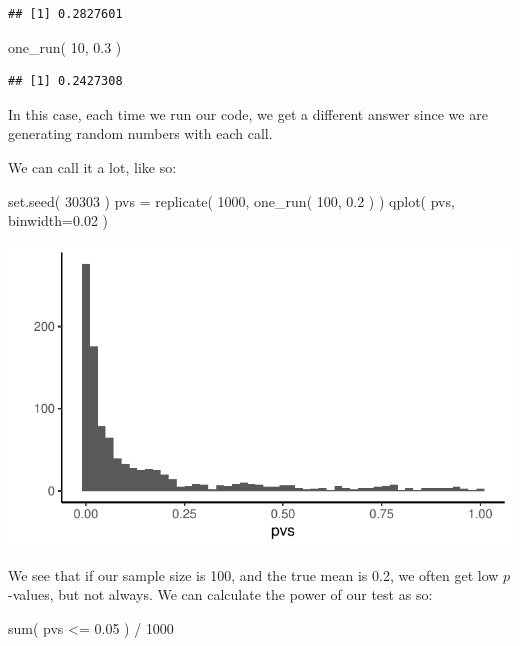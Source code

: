 \documentclass[
]{book}
\newenvironment{Shaded}{\begin{snugshade}}{\end{snugshade}}
\newcommand{\AttributeTok}[1]{\textcolor[rgb]{0.77,0.63,0.00}{#1}}
\newcommand{\DecValTok}[1]{\textcolor[rgb]{0.00,0.00,0.81}{#1}}
\newcommand{\FloatTok}[1]{\textcolor[rgb]{0.00,0.00,0.81}{#1}}
\newcommand{\FunctionTok}[1]{\textcolor[rgb]{0.00,0.00,0.00}{#1}}
\newcommand{\NormalTok}[1]{#1}
\newcommand{\OtherTok}[1]{\textcolor[rgb]{0.56,0.35,0.01}{#1}}
\newcommand{\SpecialCharTok}[1]{\textcolor[rgb]{0.00,0.00,0.00}{#1}}
\begin{document}
\begin{verbatim}
## [1] 0.2827601
\end{verbatim}

\begin{Shaded}
\begin{Highlighting}[]
\FunctionTok{one\_run}\NormalTok{( }\DecValTok{10}\NormalTok{, }\FloatTok{0.3}\NormalTok{ )}
\end{Highlighting}
\end{Shaded}

\begin{verbatim}
## [1] 0.2427308
\end{verbatim}

In this case, each time we run our code, we get a different answer since we are generating random numbers with each call.

We can call it a lot, like so:

\begin{Shaded}
\begin{Highlighting}[]
\FunctionTok{set.seed}\NormalTok{( }\DecValTok{30303}\NormalTok{ )}
\NormalTok{pvs }\OtherTok{=} \FunctionTok{replicate}\NormalTok{( }\DecValTok{1000}\NormalTok{, }\FunctionTok{one\_run}\NormalTok{( }\DecValTok{100}\NormalTok{, }\FloatTok{0.2}\NormalTok{ ) )}
\FunctionTok{qplot}\NormalTok{( pvs, }\AttributeTok{binwidth=}\FloatTok{0.02}\NormalTok{ )}
\end{Highlighting}
\end{Shaded}

\begin{center}\includegraphics[width=0.75\linewidth]{Designing-Simulations-in-R_files/figure-latex/pvalue_plot-1} \end{center}

We see that if our sample size is 100, and the true mean is 0.2, we often get low \(p\)-values, but not always. We can calculate the power of our test as so:

\begin{Shaded}
\begin{Highlighting}[]
\FunctionTok{sum}\NormalTok{( pvs }\SpecialCharTok{\textless{}=} \FloatTok{0.05}\NormalTok{ ) }\SpecialCharTok{/} \DecValTok{1000}
\end{Highlighting}
\end{Shaded}
\end{document}
